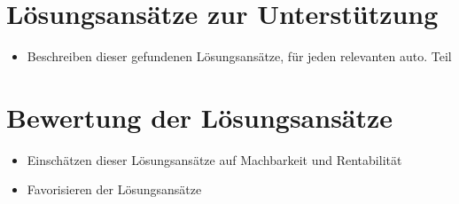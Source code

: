 \section{Lösungsansätze zur Unterstützung}
\begin{itemize}
	\item Beschreiben dieser gefundenen Lösungsansätze, für jeden relevanten auto. Teil
\end{itemize}

\section{Bewertung der Lösungsansätze}
\begin{itemize}
	\item Einschätzen dieser Lösungsansätze auf Machbarkeit und Rentabilität
	\item Favorisieren der Lösungsansätze
\end{itemize}